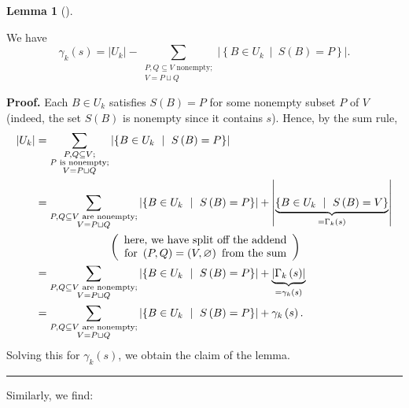 \documentclass[numbers=enddot,12pt,final,onecolumn,notitlepage]{scrartcl}%
\theoremstyle{definition}
\newtheorem{lem}[theo]{Lemma}
\newenvironment{lemma}[1][]
{\begin{lem}[#1]\begin{leftbar}}
{\end{leftbar}\end{lem}}
\newenvironment{proof}[1][Proof]{\noindent\textbf{#1.} }{\ \rule{0.5em}{0.5em}}
\let\sumnonlimits\sum
\renewcommand{\sum}{\sumnonlimits\limits}
\theoremstyle{plainsl}
\begin{document}
\begin{lemma}
\label{lem.new1}We have%
\[
\gamma_{k}\left(  s\right)  =\left\vert U_{k}\right\vert -\sum
_{\substack{P,Q\subseteq V\text{ nonempty;}\\V=P\sqcup Q}}\left\vert \left\{
B\in U_{k}\ \mid\ S\left(  B\right)  =P\right\}  \right\vert .
\]

\end{lemma}

\begin{proof}
Each $B\in U_{k}$ satisfies $S\left(  B\right)  =P$ for some nonempty subset
$P$ of $V$ (indeed, the set $S\left(  B\right)  $ is nonempty since it
contains $s$). Hence, by the sum rule,%
\begin{align*}
\left\vert U_{k}\right\vert  &  =\sum_{\substack{P,Q\subseteq V;\\P\text{ is
nonempty;}\\V=P\sqcup Q}}\left\vert \left\{  B\in U_{k}\ \mid\ S\left(
B\right)  =P\right\}  \right\vert \\
&  =\sum_{\substack{P,Q\subseteq V\text{ are nonempty;}\\V=P\sqcup
Q}}\left\vert \left\{  B\in U_{k}\ \mid\ S\left(  B\right)  =P\right\}
\right\vert +\left\vert \underbrace{\left\{  B\in U_{k}\ \mid\ S\left(
B\right)  =V\right\}  }_{=\Gamma_{k}\left(  s\right)  }\right\vert \\
&  \ \ \ \ \ \ \ \ \ \ \ \ \ \ \ \ \ \ \ \ \left(
\begin{array}
[c]{c}%
\text{here, we have split off the addend}\\
\text{for }\left(  P,Q\right)  =\left(  V,\varnothing\right)  \text{ from the
sum}%
\end{array}
\right) \\
&  =\sum_{\substack{P,Q\subseteq V\text{ are nonempty;}\\V=P\sqcup
Q}}\left\vert \left\{  B\in U_{k}\ \mid\ S\left(  B\right)  =P\right\}
\right\vert +\underbrace{\left\vert \Gamma_{k}\left(  s\right)  \right\vert
}_{=\gamma_{k}\left(  s\right)  }\\
&  =\sum_{\substack{P,Q\subseteq V\text{ are nonempty;}\\V=P\sqcup
Q}}\left\vert \left\{  B\in U_{k}\ \mid\ S\left(  B\right)  =P\right\}
\right\vert +\gamma_{k}\left(  s\right)  .
\end{align*}
Solving this for $\gamma_{k}\left(  s\right)  $, we obtain the claim of the lemma.
\end{proof}

Similarly, we find:
\end{document}
